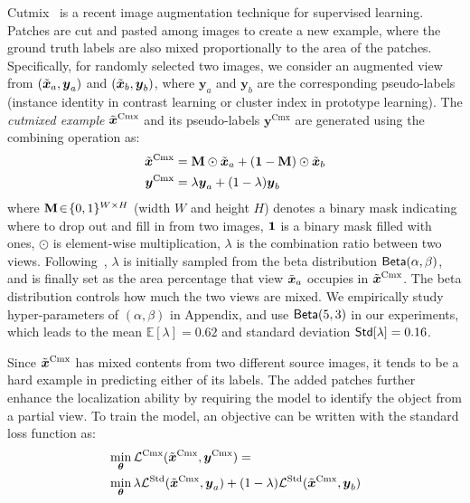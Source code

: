 \documentclass[10pt,twocolumn,letterpaper]{article}
\newcommand{\onev}{\ensuremath{{\bf 1}}}
\newcommand{\Mmat}{{\bf M}}
\newcommand{\xv}{\boldsymbol{x}}
\newcommand{\yv}{\boldsymbol{y}}
\newcommand{\thetav}{\boldsymbol{\theta}}
\newcommand{\E}{\mathbb{E}}
\newcommand{\Lcal}{\mathcal{L}}
\begin{document}
Cutmix~\cite{yun2019cutmix} is a recent image augmentation technique for supervised learning. Patches are cut and pasted among images to create a new example, where the ground truth labels are also mixed proportionally to the area of the patches.
Specifically, for randomly selected two images, we consider an augmented view from  $(\Tilde{\xv}_a, \yv_a)$ and $(\Tilde{\xv}_b, \yv_b)$, where $\yv_a$ and $\yv_b$ are the corresponding pseudo-labels (\ie instance identity in contrast learning or cluster index in prototype learning). 
The {\em cutmixed example} $\Tilde{\xv}^{\text{Cmx}}$ and its pseudo-labels $\yv^{\text{Cmx}}$ are generated using the combining operation as:
\begin{align} 
\hspace{-0mm}
\Tilde{\xv}^{\text{Cmx}}&  = \Mmat \odot  \Tilde{\xv}_a +  (\onev-\Mmat) \odot  \Tilde{\xv}_b \nonumber \\
\yv^{\text{Cmx}} & = \lambda \yv_a + (1- \lambda ) \yv_b
\label{eq_cutmix_example}
\end{align}
where $\Mmat\!\in\!\{0,1\}^{W\times H}$ (width $W$ and height $H$) denotes a binary mask indicating where to drop out and fill in from two images, $ \onev $ is a binary
mask filled with ones, $\odot$ is element-wise multiplication, $\lambda$ is the combination ratio between two views. Following~\cite{yun2019cutmix}, $\lambda$ is initially sampled from the beta distribution $\textsf{Beta}(\alpha, \beta)$, and is finally set as the area percentage that view $\Tilde{\xv}_a$ occupies in $\Tilde{\xv}^{\text{Cmx}}$. The beta distribution controls how much the two views are mixed. We empirically study  hyper-parameters of $(\alpha, \beta)$ in Appendix, and use $\textsf{Beta}(5, 3)$ in our experiments, which leads to the mean $\E[\lambda]=0.62$ and standard deviation $\textsf{Std}[\lambda]=0.16$.

Since $\Tilde{\xv}^{\text{Cmx}}$ has mixed contents from two different source images, it tends to be a hard example in predicting either of its labels. The added patches further enhance the localization ability by requiring the
model to identify the object from a partial view.
To train the model, an objective can be written with the standard loss function as:
\begin{align} 
\hspace{-0mm}
& \min_{\thetav} \Lcal^{\text{Cmx}} ( \Tilde{\xv}^{\text{Cmx}} , \yv^{\text{Cmx}}) = \nonumber \\
& \min_{\thetav}  \lambda \Lcal^{\text{Std}} ( \Tilde{\xv}^{\text{Cmx}}, \yv_a) +   (1- \lambda ) \Lcal^{\text{Std}} (\Tilde{\xv}^{\text{Cmx}}, \yv_b)
\label{eq_cutmix_obj}
\end{align}
\end{document}

